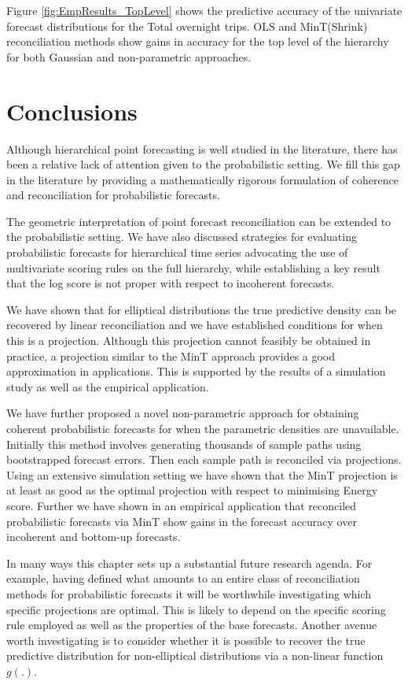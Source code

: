 \documentclass[12pt]{article}
\theoremstyle{definition}
\begin{document}
Figure \ref{fig:EmpResults_TopLevel} shows the predictive accuracy of the univariate forecast distributions for the Total overnight trips. OLS and MinT(Shrink) reconciliation methods show gains in accuracy for the top level of the hierarchy for both Gaussian and non-parametric approaches.

\section{Conclusions}\label{sec:conclusion}

Although hierarchical point forecasting is well studied in the literature, there has been a relative lack of attention given to the probabilistic setting. We fill this gap in the literature by providing a mathematically rigorous formulation of coherence and reconciliation for probabilistic forecasts.

The geometric interpretation of point forecast reconciliation can be extended to the probabilistic setting. We have also discussed strategies for evaluating probabilistic forecasts for hierarchical time series advocating the use of multivariate scoring rules on the full hierarchy, while establishing a key result that the log score is not proper with respect to incoherent forecasts.

We have shown that for elliptical distributions the true predictive density can be recovered by linear reconciliation and we have established conditions for when this is a projection. Although this projection cannot feasibly be obtained in practice, a projection similar to the MinT approach provides a good approximation in applications. This is supported by the results of a simulation study as well as the empirical application.

We have further proposed a novel non-parametric approach for obtaining coherent probabilistic forecasts for when the parametric densities are unavailable. Initially this method involves generating thousands of sample paths using bootstrapped forecast errors. Then each sample path is reconciled via projections. Using an extensive simulation setting we have shown that the MinT projection is at least as good as the optimal projection with respect to minimising Energy score. Further we have shown in an empirical application that reconciled probabilistic forecasts via MinT show gains in the forecast accuracy over incoherent and bottom-up forecasts.


In many ways this chapter sets up a substantial future research agenda. For example, having defined what amounts to an entire class of reconciliation methods for probabilistic forecasts it will be worthwhile investigating which specific projections are optimal. This is likely to depend on the specific scoring rule employed as well as the properties of the base forecasts. Another avenue worth investigating is to consider whether it is possible to recover the true predictive distribution for non-elliptical distributions via a non-linear function $g(.)$.
\end{document}

